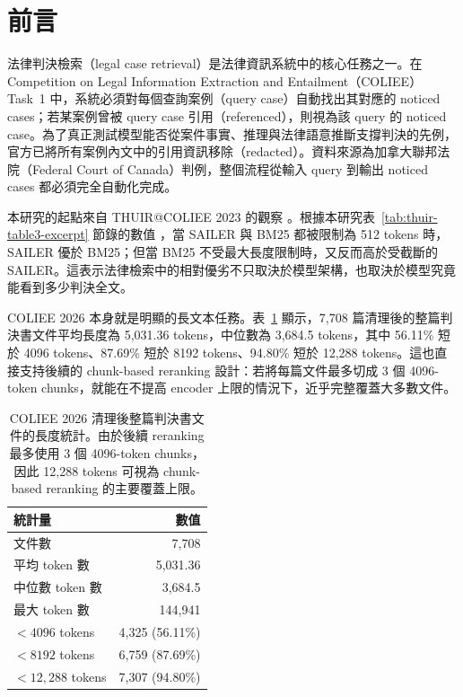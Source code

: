\section{前言}

法律判決檢索（legal case retrieval）是法律資訊系統中的核心任務之一。在 Competition on Legal Information Extraction and Entailment（COLIEE）Task~1 中，系統必須對每個查詢案例（query case）自動找出其對應的 noticed cases；若某案例曾被 query case 引用（referenced），則視為該 query 的 noticed case。為了真正測試模型能否從案件事實、推理與法律語意推斷支撐判決的先例，官方已將所有案例內文中的引用資訊移除（redacted）。資料來源為加拿大聯邦法院（Federal Court of Canada）判例，整個流程從輸入 query 到輸出 noticed cases 都必須完全自動化完成。

本研究的起點來自 THUIR@COLIEE 2023 的觀察 \cite{li2023thuir}。根據本研究表~\ref{tab:thuir-table3-excerpt} 節錄的數值 \cite{li2023thuir}，當 SAILER 與 BM25 都被限制為 512 tokens 時，SAILER 優於 BM25；但當 BM25 不受最大長度限制時，又反而高於受截斷的 SAILER。這表示法律檢索中的相對優劣不只取決於模型架構，也取決於模型究竟能看到多少判決全文。

COLIEE 2026 本身就是明顯的長文本任務。表~\ref{tab:length-stats} 顯示，7,708 篇清理後的整篇判決書文件平均長度為 5,031.36 tokens，中位數為 3,684.5 tokens，其中 56.11\% 短於 4096 tokens、87.69\% 短於 8192 tokens、94.80\% 短於 12,288 tokens。這也直接支持後續的 chunk-based reranking 設計：若將每篇文件最多切成 3 個 4096-token chunks，就能在不提高 encoder 上限的情況下，近乎完整覆蓋大多數文件。

\begin{table}[t]
  \centering
  \small
  \begin{tabular}{lr}
    \toprule
    統計量 & 數值 \\
    \midrule
    文件數 & 7,708 \\
    平均 token 數 & 5,031.36 \\
    中位數 token 數 & 3,684.5 \\
    最大 token 數 & 144,941 \\
    $<4096$ tokens & 4,325 (56.11\%) \\
    $<8192$ tokens & 6,759 (87.69\%) \\
    $<12,288$ tokens & 7,307 (94.80\%) \\
    \bottomrule
  \end{tabular}
  \caption{COLIEE 2026 清理後整篇判決書文件的長度統計。由於後續 reranking 最多使用 3 個 4096-token chunks，因此 12,288 tokens 可視為 chunk-based reranking 的主要覆蓋上限。}
  \label{tab:length-stats}
\end{table}

